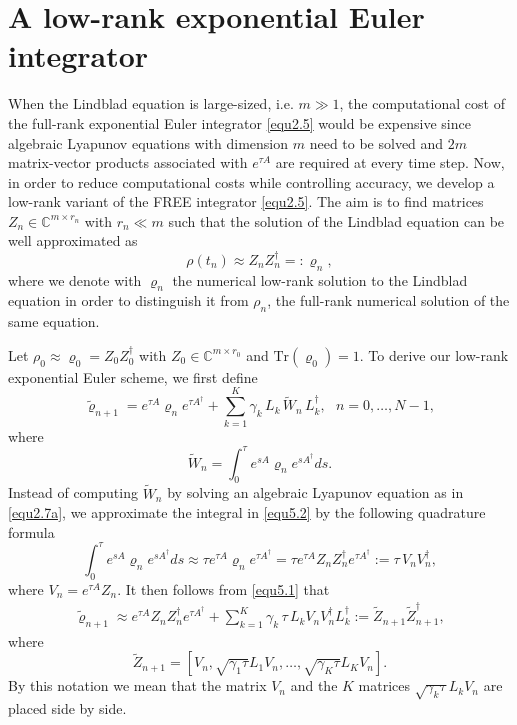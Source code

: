 \documentclass[preprint,3p,compress,12pt]{elsarticle}
\numberwithin{equation}{section}
\numberwithin{figure}{section}
\begin{document}
\section{A low-rank exponential Euler integrator}
When the Lindblad equation is large-sized, i.e. $m\gg 1$, the computational cost of the full-rank exponential Euler integrator \eqref{equ2.5} would be expensive since algebraic Lyapunov equations with dimension $m$ need to be solved and $2m$ matrix-vector products associated with $e^{\tau A}$ are required at every time step. Now, in order to reduce computational costs while controlling accuracy, we develop a low-rank variant of the FREE integrator \eqref{equ2.5}. The aim is to find matrices $Z_n\in \mathbb{C}^{m\times r_n}$ with $r_n\ll m$ such that the solution of the Lindblad equation can be well approximated as
\[
\rho(t_n)\approx Z_nZ_n^{\dag} =:  \varrho_n ,
\]
where we denote with $\varrho_n$ the numerical low-rank solution
to the Lindblad equation in order to distinguish it from $\rho_n$, the full-rank
numerical solution of the same equation.

Let $\rho_0\approx \varrho_0=Z_0Z_0^{\dag}$ with $Z_0\in \mathbb{C}^{m\times r_0}$ and $\mbox{Tr}(\varrho_0)=1$. To derive our low-rank exponential Euler scheme, we first define
\begin{equation}\label{equ5.1}
  \tilde{\varrho}_{n+1}=e^{\tau A}\varrho_ne^{\tau A^{\dag}}+\sum_{k=1}^K\gamma_k \, L_k  \, \tilde{W}_n \, L_k^{\dag},~~~n=0,\ldots,N-1,
\end{equation}
where
\begin{equation}\label{equ5.2}
  \tilde{W}_n=\int_0^{\tau}e^{sA}\varrho_ne^{sA^{\dag}}ds.
\end{equation}
Instead of computing $\tilde{W}_n$ by solving an algebraic Lyapunov equation as in \eqref{equ2.7a}, we approximate the integral in \eqref{equ5.2} by the following quadrature formula
\begin{equation}\label{equ5.3}
  \int_0^{\tau}e^{sA}\varrho_ne^{sA^{\dag}}ds\approx
  \tau e^{\tau A}\varrho_ne^{\tau A^{\dag}}=
  \tau e^{\tau A}Z_nZ_n^{\dag}e^{\tau A^{\dag}}:=\tau \, V_nV_n^{\dag},
\end{equation}
where $V_n=e^{\tau A}Z_n$.
It then follows from \eqref{equ5.1} that
\begin{eqnarray*}
  \tilde{\varrho}_{n+1}\approx e^{\tau A}Z_nZ_n^{\dag}e^{\tau A^{\dag}}+\sum_{k=1}^K\gamma_k \, \tau \, L_kV_nV_n^{\dag}L_k^{\dag}
  :=\tilde{Z}_{n+1}\tilde{Z}_{n+1}^{\dag},
\end{eqnarray*}
where
\[\tilde{Z}_{n+1}=\left[V_n,\sqrt{\gamma_1\tau}L_1V_n,\ldots,\sqrt{\gamma_K\tau}L_KV_n\right].\]
By this notation we mean that the matrix $V_n$ and the $K$ matrices $\sqrt{\gamma_k\tau}L_kV_n$ are placed side by side.
\end{document}
